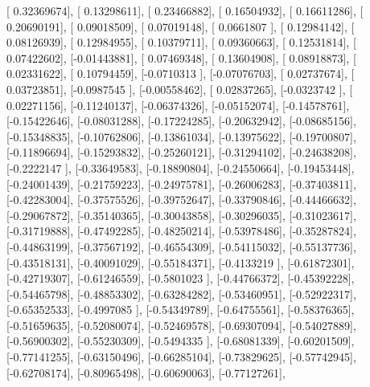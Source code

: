 \documentclass{article}
\begin{document}
       [ 0.32369674],
       [ 0.13298611],
       [ 0.23466882],
       [ 0.16504932],
       [ 0.16611286],
       [ 0.20690191],
       [ 0.09018509],
       [ 0.07019148],
       [ 0.0661807 ],
       [ 0.12984142],
       [ 0.08126939],
       [ 0.12984955],
       [ 0.10379711],
       [ 0.09360663],
       [ 0.12531814],
       [ 0.07422602],
       [-0.01443881],
       [ 0.07469348],
       [ 0.13604908],
       [ 0.08918873],
       [ 0.02331622],
       [ 0.10794459],
       [-0.0710313 ],
       [-0.07076703],
       [ 0.02737674],
       [ 0.03723851],
       [-0.0987545 ],
       [-0.00558462],
       [ 0.02837265],
       [-0.0323742 ],
       [ 0.02271156],
       [-0.11240137],
       [-0.06374326],
       [-0.05152074],
       [-0.14578761],
       [-0.15422646],
       [-0.08031288],
       [-0.17224285],
       [-0.20632942],
       [-0.08685156],
       [-0.15348835],
       [-0.10762806],
       [-0.13861034],
       [-0.13975622],
       [-0.19700807],
       [-0.11896694],
       [-0.15293832],
       [-0.25260121],
       [-0.31294102],
       [-0.24638208],
       [-0.2222147 ],
       [-0.33649583],
       [-0.18890804],
       [-0.24550664],
       [-0.19453448],
       [-0.24001439],
       [-0.21759223],
       [-0.24975781],
       [-0.26006283],
       [-0.37403811],
       [-0.42283004],
       [-0.37575526],
       [-0.39752647],
       [-0.33790846],
       [-0.44466632],
       [-0.29067872],
       [-0.35140365],
       [-0.30043858],
       [-0.30296035],
       [-0.31023617],
       [-0.31719888],
       [-0.47492285],
       [-0.48250214],
       [-0.53978486],
       [-0.35287824],
       [-0.44863199],
       [-0.37567192],
       [-0.46554309],
       [-0.54115032],
       [-0.55137736],
       [-0.43518131],
       [-0.40091029],
       [-0.55184371],
       [-0.4133219 ],
       [-0.61872301],
       [-0.42719307],
       [-0.61246559],
       [-0.5801023 ],
       [-0.44766372],
       [-0.45392228],
       [-0.54465798],
       [-0.48853302],
       [-0.63284282],
       [-0.53460951],
       [-0.52922317],
       [-0.65352533],
       [-0.4997085 ],
       [-0.54349789],
       [-0.64755561],
       [-0.58376365],
       [-0.51659635],
       [-0.52080074],
       [-0.52469578],
       [-0.69307094],
       [-0.54027889],
       [-0.56900302],
       [-0.55230309],
       [-0.5494335 ],
       [-0.68081339],
       [-0.60201509],
       [-0.77141255],
       [-0.63150496],
       [-0.66285104],
       [-0.73829625],
       [-0.57742945],
       [-0.62708174],
       [-0.80965498],
       [-0.60690063],
       [-0.77127261],
\end{document}
